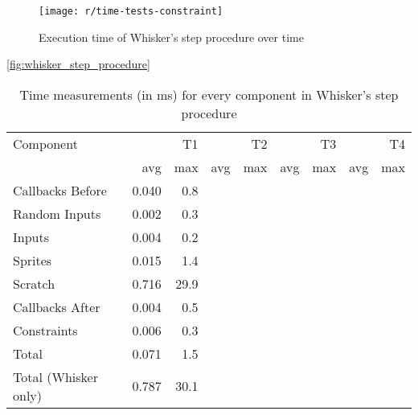 \begin{figure}[htpb]
    \centering
    \texttt{[image: r/time-tests-constraint]}
    \caption{Execution time of Whisker's step procedure over time}
    \label{fig:time_tests_constraint}
\end{figure}

\ref{fig:whisker_step_procedure}
\begin{table}[htpb]
    \centering
    \small
    \begin{tabular}{l|rr|rr|rr|rr}
        \toprule
        Component            &       & T1   &       & T2   &        & T3   &       & T4   \\
                             & avg   & max  & avg   & max  & avg    & max  & avg   & max  \\
        \midrule
        Callbacks Before     & 0.040 &  0.8 &       &      &        &      &       &      \\
        Random Inputs        & 0.002 &  0.3 &       &      &        &      &       &      \\
        Inputs               & 0.004 &  0.2 &       &      &        &      &       &      \\
        Sprites              & 0.015 &  1.4 &       &      &        &      &       &      \\
        Scratch              & 0.716 & 29.9 &       &      &        &      &       &      \\
        Callbacks After      & 0.004 &  0.5 &       &      &        &      &       &      \\
        Constraints          & 0.006 &  0.3 &       &      &        &      &       &      \\
        \midrule
        Total                & 0.071 &  1.5 &       &      &        &      &       &      \\
        Total (Whisker only) & 0.787 & 30.1 &       &      &        &      &       &      \\
        \bottomrule
    \end{tabular}
    \caption{Time measurements (in ms) for every component in Whisker's step procedure}
    \label{tab:component_time_measurements}
\end{table}
